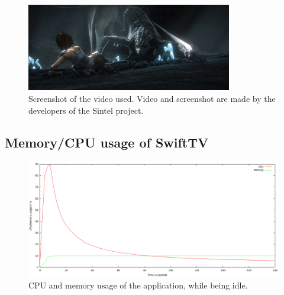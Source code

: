 \begin{center}
\begin{figure}[h]
	\centering
	\mbox{\includegraphics[width=0.8\textwidth]{Images/sintel.jpg}}
	\caption{Screenshot of the video used. Video and screenshot are made by the developers of the Sintel project.}
	\label{fig:sintel}
\end{figure}

\end{center}
\scalebox{0.6}{

}

\subsection{Memory/CPU usage of SwiftTV}

\begin{center}
\begin{figure}[h]
	\centering
	\mbox{\includegraphics[width=1.2\textwidth]{Images/idle.png}}
	\caption{CPU and memory usage of the application, while being idle.}
	\label{graph:idle}
\end{figure}
\end{center}

